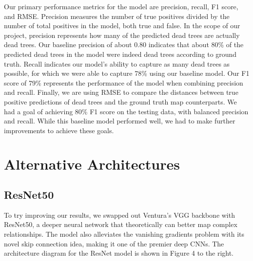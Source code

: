 \documentclass[conference]{ieeetran}
\begin{document}
Our primary performance metrics for the model are precision, recall, F1 score, and RMSE. Precision measures the number of true positives divided by the number of total positives in the model, both true and false. In the scope of our project, precision represents how many of the predicted dead trees are actually dead trees. Our baseline precision of about 0.80 indicates that about 80\% of the predicted dead trees in the model were indeed dead trees according to ground truth. Recall indicates our model’s ability to capture as many dead trees as possible, for which we were able to capture 78\% using our baseline model. Our F1 score of 79\% represents the performance of the model when combining precision and recall. Finally, we are using RMSE to compare the distances between true positive predictions of dead trees and the ground truth map counterparts. We had a goal of achieving 80\% F1 score on the testing data, with balanced precision and recall. While this baseline model performed well, we had to make further improvements to achieve these goals. 

\section{Alternative Architectures} 

\subsection{ResNet50}

To try improving our results, we swapped out Ventura’s VGG backbone with ResNet50, a deeper neural network that theoretically can better map complex relationships. The model also alleviates the vanishing gradients problem with its novel skip connection idea, making it one of the premier deep CNNs. The architecture diagram for the ResNet model is shown in Figure 4 to the right.
\end{document}
